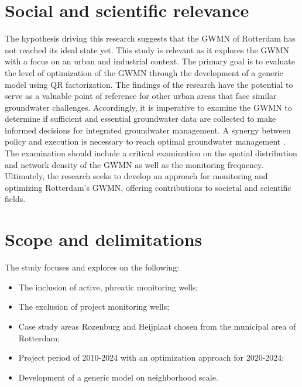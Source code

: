 \section{Social and scientific relevance}
The hypothesis driving this research suggests that the GWMN of Rotterdam has not reached its ideal state yet. This study is relevant as it explores the GWMN with a focus on an urban and industrial context. The primary goal is to evaluate the level of optimization of the GWMN through the development of a generic model using QR factorization. The findings of the research have the potential to serve as a valuable point of reference for other urban areas that face similar groundwater challenges. Accordingly, it is imperative to examine the GWMN to determine if sufficient and essential groundwater data are collected to make informed decisions for integrated groundwater management. A synergy between policy and execution is necessary to reach optimal groundwater management \cite{hoogvliet-2020}. The examination should include a critical examination on the spatial distribution and network density of the GWMN as well as the monitoring frequency. Ultimately, the research seeks to develop an approach for monitoring and optimizing Rotterdam's GWMN, offering contributions to societal and scientific fields. 

\section{Scope and delimitations}
The study focuses and explores on the following: 
\begin{itemize}
    \item The inclusion of active, phreatic monitoring wells; 
    \item The exclusion of project monitoring wells; 
    \item Case study areas Rozenburg and Heijplaat chosen from the municipal area of Rotterdam; 
    \item Project period of 2010-2024 with an optimization approach for 2020-2024; 
    \item Development of a generic model on neighborhood scale. 
\end{itemize}


